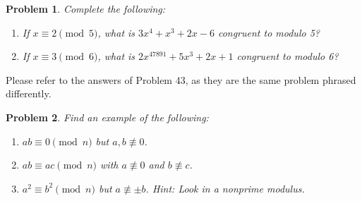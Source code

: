 \documentclass[12pt]{article}
\newtheorem{problem}{Problem}
\numberwithin{problem}{section} %
\theoremstyle{remark}  %
\newenvironment{answer}
    {\begin{adjustwidth}{0pt}{0pt}}
    {\end{adjustwidth}}
\begin{document}
\vspace{5pt}
    \setcounter{problem}{31}
    \begin{problem}
        Complete the following:
        \begin{enumerate}[label=(\alph*)]
            \item If $x \equiv 2 \pmod{5}$, what is $3x^4+x^3+2x-6$ congruent to modulo 5?
            \item If $x \equiv 3 \pmod{6}$, what is $2x^{47891}+5x^3+2x+1$ congruent to modulo 6?
        \end{enumerate}
    \end{problem}
    \begin{answer}
        Please refer to the answers of Problem 43, as they are the same problem phrased differently.
    \end{answer}
\vspace{5pt}
    \setcounter{problem}{33}
    \begin{problem}
        Find an example of the following:
        \begin{enumerate}[label=(\alph*)]
            \item $ab \equiv 0 \pmod{n}$ but $a,b \not\equiv 0$.
            \item $ab \equiv ac \pmod{n}$ with $a \not\equiv 0$  and $b \not\equiv c$.
            \item $a^2 \equiv b^2 \pmod{n}$ but $a \not\equiv\pm b$. Hint: Look in a nonprime modulus.
        \end{enumerate}
    \end{problem}
\vspace{5pt}
    \setcounter{problem}{35}
\end{document}
